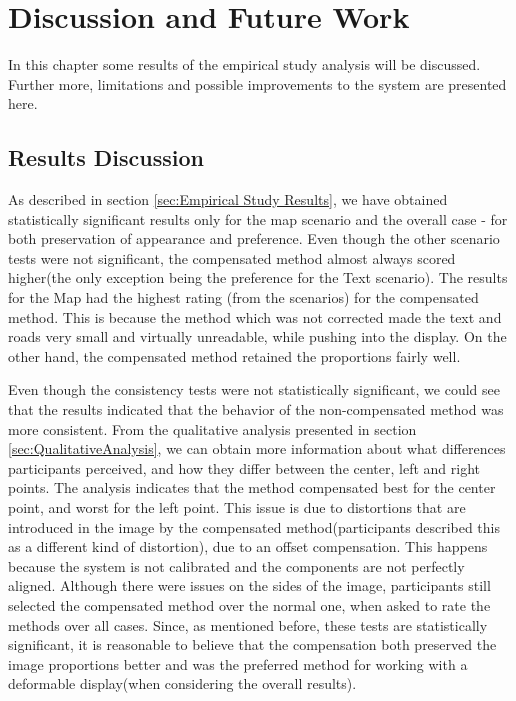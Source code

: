 \documentclass[]{article}
\begin{document}
\clearpage
\section{Discussion and Future Work}

In this chapter some results of the empirical study analysis will be discussed. Further more, limitations and possible improvements to the system are presented here.

\subsection{Results Discussion}

As described in section \ref{sec:Empirical Study Results}, we have obtained statistically significant results only for the map scenario and the overall case - for both preservation of appearance and preference. Even though the other scenario tests were not significant, the compensated method almost always scored higher(the only exception being the preference for the Text scenario). The results for the Map had the highest rating (from the scenarios) for the compensated method. This is because the method which was not corrected made the text and roads very small and virtually unreadable, while pushing into the display. On the other hand, the compensated method retained the proportions fairly well.

Even though the consistency tests were not statistically significant, we could see that the results indicated that the behavior of the non-compensated method was more consistent. From the qualitative analysis presented in section \ref{sec:QualitativeAnalysis}, we can obtain more information about what differences participants perceived, and how they differ between the center, left and right points. The analysis indicates that the method compensated best for the center point, and worst for the left point. This issue is due to distortions that are introduced in the image by the compensated method(participants described this as a different kind of distortion), due to an offset compensation. This happens because the system is not calibrated and the components are not perfectly aligned. Although there were issues on the sides of the image, participants still selected the compensated method over the normal one, when asked to rate the methods over all cases. Since, as mentioned before, these tests are statistically significant, it is reasonable to believe that the compensation both preserved the image proportions better and was the preferred method for working with a deformable display(when considering the overall results).
\end{document}
